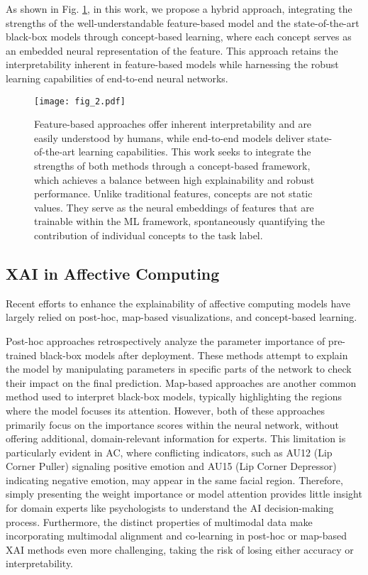     As shown in Fig. \ref{fig_ven}, in this work, we propose a hybrid approach, integrating the strengths of the well-understandable feature-based model and the state-of-the-art black-box models through concept-based learning, where each concept serves as an embedded neural representation of the feature. This approach retains the interpretability inherent in feature-based models while harnessing the robust learning capabilities of end-to-end neural networks. 

    \begin{figure}[t]
    \centering
    \texttt{[image: fig\_2.pdf]}
       \caption{Feature-based approaches offer inherent interpretability and are easily understood by humans, while end-to-end models deliver state-of-the-art learning capabilities. This work seeks to integrate the strengths of both methods through a concept-based framework, which achieves a balance between high explainability and robust performance. Unlike traditional features, concepts are not static values. They serve as the neural embeddings of features that are trainable within the ML framework, spontaneously quantifying the contribution of individual concepts to the task label. }
    \label{fig_ven}
    \end{figure}
    

\subsection{XAI in Affective Computing} \label{xai_in_ac}
    Recent efforts to enhance the explainability of affective computing models have largely relied on post-hoc, map-based visualizations, and concept-based learning.

    Post-hoc approaches \cite{ribeiro2016should,heimerl2020unraveling,malik2021towards, Wu2019Enhancing} retrospectively analyze the parameter importance of pre-trained black-box models after deployment. These methods attempt to explain the model by manipulating parameters in specific parts of the network to check their impact on the final prediction. Map-based approaches \cite{gund2021interpretable,belharbi2024guided} are another common method used to interpret black-box models, typically highlighting the regions where the model focuses its attention. However, both of these approaches primarily focus on the importance scores within the neural network, without offering additional, domain-relevant information for experts. This limitation is particularly evident in AC, where conflicting indicators, such as AU12 (Lip Corner Puller) signaling positive emotion and AU15 (Lip Corner Depressor) indicating negative emotion, may appear in the same facial region. Therefore, simply presenting the weight importance or model attention provides little insight for domain experts like psychologists to understand the AI decision-making process. Furthermore, the distinct properties of multimodal data make incorporating multimodal alignment and co-learning in post-hoc or map-based XAI methods even more challenging, taking the risk of losing either accuracy or interpretability.

